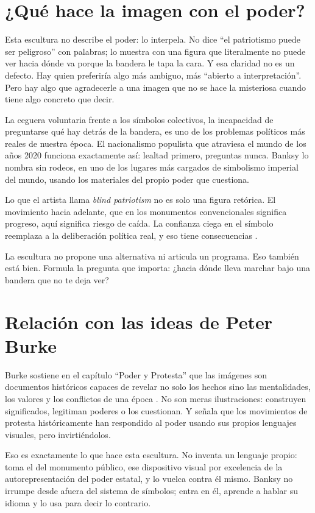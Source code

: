 \documentclass[12pt, a4paper]{article}
\begin{document}
\section{¿Qué hace la imagen con el poder?}

Esta escultura no describe el poder: lo interpela. No dice ``el patriotismo puede ser peligroso'' con palabras; lo muestra con una figura que literalmente no puede ver hacia dónde va porque la bandera le tapa la cara. Y esa claridad no es un defecto. Hay quien preferiría algo más ambiguo, más ``abierto a interpretación''. Pero hay algo que agradecerle a una imagen que no se hace la misteriosa cuando tiene algo concreto que decir.

La ceguera voluntaria frente a los símbolos colectivos, la incapacidad de preguntarse qué hay detrás de la bandera, es uno de los problemas políticos más reales de nuestra época. El nacionalismo populista que atraviesa el mundo de los años 2020 funciona exactamente así: lealtad primero, preguntas nunca. Banksy lo nombra sin rodeos, en uno de los lugares más cargados de simbolismo imperial del mundo, usando los materiales del propio poder que cuestiona.

Lo que el artista llama \textit{blind patriotism} no es solo una figura retórica. El movimiento hacia adelante, que en los monumentos convencionales significa progreso, aquí significa riesgo de caída. La confianza ciega en el símbolo reemplaza a la deliberación política real, y eso tiene consecuencias \cite{smithsonian2026}.

La escultura no propone una alternativa ni articula un programa. Eso también está bien. Formula la pregunta que importa: ¿hacia dónde lleva marchar bajo una bandera que no te deja ver?

\section{Relación con las ideas de Peter Burke}

Burke sostiene en el capítulo ``Poder y Protesta'' que las imágenes son documentos históricos capaces de revelar no solo los hechos sino las mentalidades, los valores y los conflictos de una época \cite{burke2001}. No son meras ilustraciones: construyen significados, legitiman poderes o los cuestionan. Y señala que los movimientos de protesta históricamente han respondido al poder usando sus propios lenguajes visuales, pero invirtiéndolos.

Eso es exactamente lo que hace esta escultura. No inventa un lenguaje propio: toma el del monumento público, ese dispositivo visual por excelencia de la autorepresentación del poder estatal, y lo vuelca contra él mismo. Banksy no irrumpe desde afuera del sistema de símbolos; entra en él, aprende a hablar su idioma y lo usa para decir lo contrario.
\end{document}

